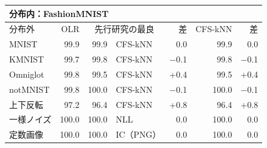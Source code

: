 \documentclass[border=3pt]{standalone}
\begin{document}
%
\begin{tabular}[t]{lrrlrrr}
\toprule
\multicolumn{7}{l}{分布内：FashionMNIST}\\
\midrule
分布外 & OLR & \multicolumn{2}{c}{先行研究の最良} & 差 & CFS-kNN & 差\\
\midrule
MNIST & 99.9 & 99.9 & CFS-kNN & 0.0 & 99.9 & 0.0\\
KMNIST & 99.7 & 99.8 & CFS-kNN & −0.1 & 99.8 & −0.1\\
Omniglot & 99.8 & 99.5 & CFS-kNN & +0.4 & 99.5 & +0.4\\
notMNIST & 99.8 & 100.0 & CFS-kNN & −0.1 & 100.0 & −0.1\\
上下反転 & 97.2 & 96.4 & CFS-kNN & +0.8 & 96.4 & +0.8\\
一様ノイズ & 100.0 & 100.0 & NLL & 0.0 & 100.0 & 0.0\\
定数画像 & 100.0 & 100.0 & IC（PNG） & 0.0 & 100.0 & 0.0\\
\bottomrule
\end{tabular}%
\end{document}
